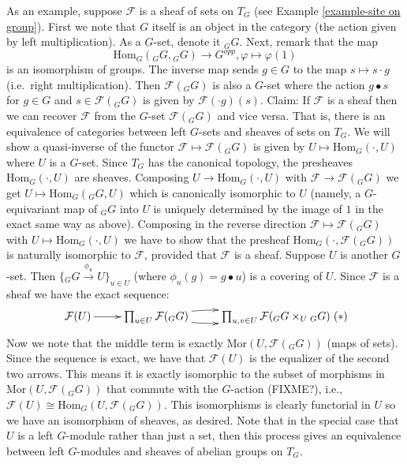 \begin{example}
As an example, suppose $\mathcal{F}$ is a sheaf of sets on $T_G$
(see Example \ref{example-site on group}).  First we note that $G$ 
itself is an object in the category (the action given by left 
multiplication). As a $G$-set, denote it ${}_GG$. Next, remark that
the map
$$
\text{Hom}_G({}_GG,{}_GG) \longrightarrow G^{opp}, 
\varphi \longmapsto \varphi(1)
$$
is an isomorphism of groups. The inverse map sends $g \in G$
to the map $ s \mapsto s \cdot g$ (i.e.\ right multiplication). Then
$\mathcal{F}({}_GG)$ is also a $G$-set where the action $g \bullet s$
for $g \in G$ and $s \in \mathcal{F}({}_GG)$ is given by
$\mathcal{F}(\cdot g)(s)$. Claim: If $\mathcal{F}$ is a sheaf then we
can recover $\mathcal{F}$ from the $G$-set $\mathcal{F}({}_GG)$
and vice versa. That is, there is an equivalence of categories
between left $G$-sets and sheaves of sets on $T_G$. We will show a
quasi-inverse of the functor $\mathcal{F} \mapsto \mathcal{F}({}_GG)$ is
given by $U \mapsto \text{Hom}_G(\cdot, U)$ where $U$ is a $G$-set. 
Since $T_G$ has the canonical topology, the presheaves  
$\text{Hom}_G(\cdot, U)$ are sheaves.
Composing $U \rightarrow \text{Hom}_G(\cdot, U)$ with 
$\mathcal{F} \rightarrow \mathcal{F}({}_GG)$ we get 
$U \mapsto \text{Hom}_G({}_GG,U)$ which is
canonically isomorphic to $U$ (namely, a $G$-equivariant map of ${}_GG$ 
into $U$ is uniquely determined by the image of $1$ in the exact same way 
as above). Composing in the reverse direction $\mathcal{F} \mapsto 
\mathcal{F}({}_GG)$ with $U \mapsto \text{Hom}_G(\cdot, U)$ we have to 
show that the presheaf $\text{Hom}_G(\cdot, \mathcal{F}({}_GG))$ is naturally
isomorphic to $\mathcal{F}$, provided that $\mathcal{F}$ is a sheaf.
Suppose $U$ is another $G$-set. Then
$\{{}_GG \stackrel{\phi_u}{\rightarrow} U\}_{u \in U}$ (where
$\phi_u(g) = g \bullet u$) is a covering of $U$. Since $\mathcal{F}$ is a 
sheaf we have the exact sequence:
$$
\xymatrix{ \mathcal{F}(U) \ar[r] & \prod\nolimits_{u \in U}
\mathcal{F}({}_GG) \ar@/^/[r] \ar@/_/[r] & \prod\nolimits_{u, v \in
U} \mathcal{F}({}_GG \times_U{}_GG) } \leqno{(*)}
$$
Now we note that the middle term is exactly 
$\text{Mor}(U,\mathcal{F}({}_GG))$ (maps of sets). Since the sequence is 
exact, we have that $\mathcal{F}(U)$ is the equalizer of the second two
arrows. This means it is exactly isomorphic to the subset of morphisms in
$\text{Mor}(U, \mathcal{F}(_G G))$ that commute with the $G$-action (FIXME?),
i.e., $\mathcal{F}(U) \cong \text{Hom}_G(U, \mathcal{F}({}_GG))$.
This isomorphisms is clearly functorial in $U$ so we have an
isomorphism of sheaves, as desired. Note that in the special case that 
$U$ is a left $G$-module rather than just a set, then this process gives 
an equivalence between left $G$-modules and sheaves of abelian groups on $T_G$.
\end{example}

